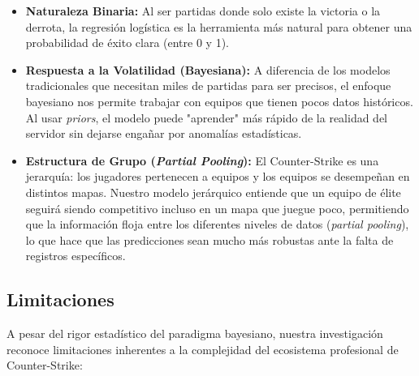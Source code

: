 \documentclass[twocolumn,10pt]{article}
\begin{document}
\begin{itemize}
    \item \textbf{Naturaleza Binaria:} Al ser partidas donde solo existe la victoria o la derrota, la regresión logística es la herramienta más natural para obtener una probabilidad de éxito clara (entre 0 y 1).
    \item \textbf{Respuesta a la Volatilidad (Bayesiana):} A diferencia de los modelos tradicionales que necesitan miles de partidas para ser precisos, el enfoque bayesiano nos permite trabajar con equipos que tienen pocos datos históricos. Al usar \textit{priors}, el modelo puede "aprender" más rápido de la realidad del servidor sin dejarse engañar por anomalías estadísticas.
    \item \textbf{Estructura de Grupo (\textit{Partial Pooling}):} El Counter-Strike es una jerarquía: los jugadores pertenecen a equipos y los equipos se desempeñan en distintos mapas. Nuestro modelo jerárquico entiende que un equipo de élite seguirá siendo competitivo incluso en un mapa que juegue poco, permitiendo que la información floja entre los diferentes niveles de datos (\textit{partial pooling}), lo que hace que las predicciones sean mucho más robustas ante la falta de registros específicos.
\end{itemize}

\subsection{Limitaciones}
A pesar del rigor estadístico del paradigma bayesiano, nuestra investigación reconoce limitaciones inherentes a la complejidad del ecosistema profesional de Counter-Strike:
\end{document}

